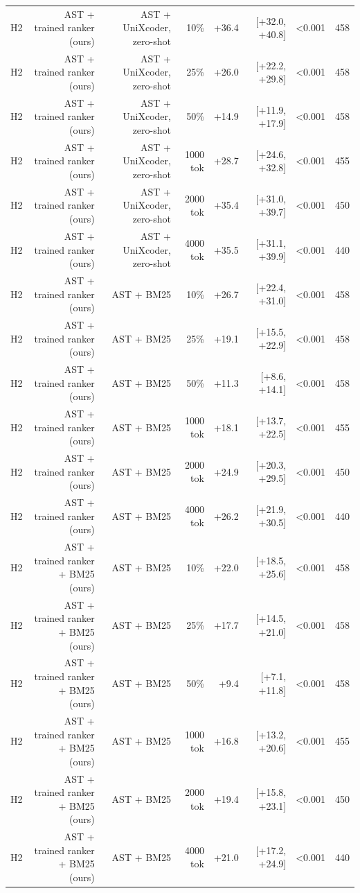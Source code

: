 \begin{tabular}{lrrrrrrr}
H2 & AST + trained ranker (ours) & AST + UniXcoder, zero-shot & 10\% & +36.4 & [+32.0, +40.8] & <0.001 & 458 \\
H2 & AST + trained ranker (ours) & AST + UniXcoder, zero-shot & 25\% & +26.0 & [+22.2, +29.8] & <0.001 & 458 \\
H2 & AST + trained ranker (ours) & AST + UniXcoder, zero-shot & 50\% & +14.9 & [+11.9, +17.9] & <0.001 & 458 \\
H2 & AST + trained ranker (ours) & AST + UniXcoder, zero-shot & 1000 tok & +28.7 & [+24.6, +32.8] & <0.001 & 455 \\
H2 & AST + trained ranker (ours) & AST + UniXcoder, zero-shot & 2000 tok & +35.4 & [+31.0, +39.7] & <0.001 & 450 \\
H2 & AST + trained ranker (ours) & AST + UniXcoder, zero-shot & 4000 tok & +35.5 & [+31.1, +39.9] & <0.001 & 440 \\
H2 & AST + trained ranker (ours) & AST + BM25 & 10\% & +26.7 & [+22.4, +31.0] & <0.001 & 458 \\
H2 & AST + trained ranker (ours) & AST + BM25 & 25\% & +19.1 & [+15.5, +22.9] & <0.001 & 458 \\
H2 & AST + trained ranker (ours) & AST + BM25 & 50\% & +11.3 & [+8.6, +14.1] & <0.001 & 458 \\
H2 & AST + trained ranker (ours) & AST + BM25 & 1000 tok & +18.1 & [+13.7, +22.5] & <0.001 & 455 \\
H2 & AST + trained ranker (ours) & AST + BM25 & 2000 tok & +24.9 & [+20.3, +29.5] & <0.001 & 450 \\
H2 & AST + trained ranker (ours) & AST + BM25 & 4000 tok & +26.2 & [+21.9, +30.5] & <0.001 & 440 \\
H2 & AST + trained ranker + BM25 (ours) & AST + BM25 & 10\% & +22.0 & [+18.5, +25.6] & <0.001 & 458 \\
H2 & AST + trained ranker + BM25 (ours) & AST + BM25 & 25\% & +17.7 & [+14.5, +21.0] & <0.001 & 458 \\
H2 & AST + trained ranker + BM25 (ours) & AST + BM25 & 50\% & +9.4 & [+7.1, +11.8] & <0.001 & 458 \\
H2 & AST + trained ranker + BM25 (ours) & AST + BM25 & 1000 tok & +16.8 & [+13.2, +20.6] & <0.001 & 455 \\
H2 & AST + trained ranker + BM25 (ours) & AST + BM25 & 2000 tok & +19.4 & [+15.8, +23.1] & <0.001 & 450 \\
H2 & AST + trained ranker + BM25 (ours) & AST + BM25 & 4000 tok & +21.0 & [+17.2, +24.9] & <0.001 & 440 \\
\bottomrule
\end{tabular}
